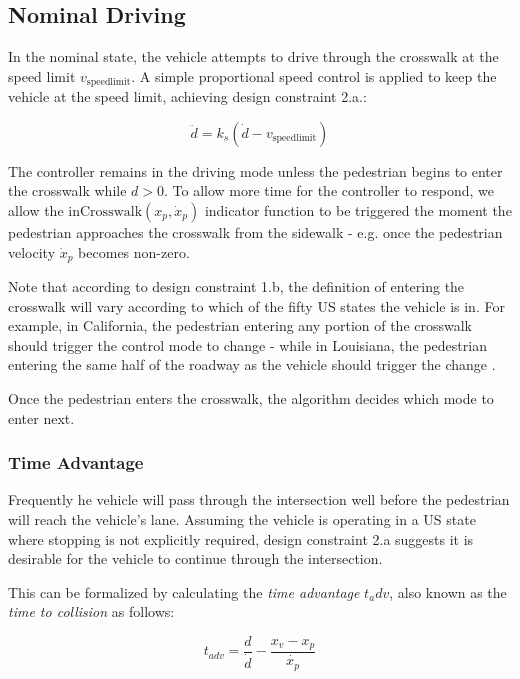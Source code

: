 \documentclass[letterpaper, 10 pt, conference]{ieeeconf}  %
\begin{document}
\subsection{Nominal Driving}
In the nominal state, the vehicle attempts to drive through the crosswalk at the speed limit $v_\mathrm{speedlimit}$. A simple proportional speed control is applied to keep the vehicle at the speed limit, achieving design constraint 2.a.:

\begin{equation}
	\ddot{d} = k_s(\dot{d} - v_\mathrm{speedlimit})
\end{equation}

The controller remains in the driving mode unless the pedestrian begins to enter the crosswalk while $d > 0$. To allow more time for the controller to respond, we allow the $\mathrm{inCrosswalk}(x_p, \dot{x}_p)$ indicator function to be triggered the moment the pedestrian approaches the crosswalk from the sidewalk - e.g. once the pedestrian velocity $\dot{x}_p$ becomes non-zero. 

 Note that according to design constraint 1.b, the definition of entering the crosswalk will vary according to which of the fifty US states the vehicle is in. For example, in California, the pedestrian entering any portion of the crosswalk should trigger the control mode to change - while in Louisiana, the pedestrian entering the same half of the roadway as the vehicle should trigger the change \cite{NCSL2018}.  

Once the pedestrian enters the crosswalk, the algorithm decides which mode to enter next. 

\subsubsection{Time Advantage}

Frequently he vehicle will pass through the intersection well before the pedestrian will reach the vehicle's lane. Assuming the vehicle is operating in a US state where stopping is not explicitly required, design constraint 2.a suggests it is desirable for the vehicle to continue through the intersection.

This can be formalized by calculating the \textit{time advantage} $t_adv$, also known as the \textit{time to collision} as follows:

\begin{equation}
t_{adv} = \frac{d}{\dot{d}} - \frac{x_v - x_p}{\dot{x_p}}
\end{equation}
\end{document}

